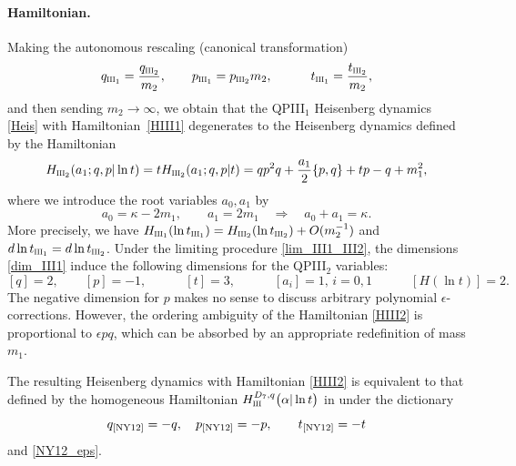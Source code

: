 \documentclass[12pt,a4paper]{article}
\numberwithin{equation}{section}
\newcommand{\III}{\scalebox{.6}{III}}
\begin{document}
\paragraph{Hamiltonian.}  Making the autonomous rescaling (canonical transformation)
\begin{equation}\label{lim_III1_III2}
 q_{\III_1}=\frac{q_{\III_2}}{m_2}, \qquad p_{\III_1}=p_{\III_2}m_2, \qquad \quad  t_{\III_1}=\frac{t_{\III_2}}{m_2},
 \end{equation}
 and then sending $m_2\rightarrow\infty$, we obtain that the QPIII$_1$ Heisenberg dynamics \eqref{Heis} with Hamiltonian~\eqref{HIII1} degenerates to the Heisenberg dynamics defined by the Hamiltonian
 \begin{equation}\label{HIII2}
 H_{\III_2}(a_1;q,p|\ln t)=t H_{\III_2}(a_1;q,p|t)=qp^2q+\frac{a_1}2\{p,q\}+t p-q+m_1^2,
 \end{equation}
 where we introduce the root variables $a_0,a_1$ by
\begin{equation}
a_0=\kappa-2m_1, \qquad a_1=2m_1  \quad \Rightarrow \quad a_0+a_1=\kappa.  
\end{equation} 
More precisely, we have
$H_{\III_1}(\ln t_{\III_1})=H_{\III_2}(\ln t_{\III_2})+O(m_2^{-1})$ and $d\ln t_{\III_1}=d\ln t_{\III_2}$.
Under the limiting procedure \eqref{lim_III1_III2}, the dimensions \eqref{dim_III1} induce the following dimensions for the QPIII$_2$ variables:
\begin{equation}\label{dim_III2}
[q]=2, \qquad [p]=-1, \qquad \quad [t]=3, \qquad \quad  [a_i]=1,\, {\scriptstyle i=0,1} \qquad \quad [H(\ln t)]=2.
\end{equation}
The negative dimension for $p$ makes no sense to discuss arbitrary polynomial $\epsilon$-corrections. However, the ordering ambiguity of the Hamiltonian \eqref{HIII2} is proportional to $\epsilon pq$, which can be absorbed by an appropriate redefinition of mass $m_1$.

The resulting Heisenberg dynamics with Hamiltonian \eqref{HIII2} is
equivalent to that defined by the homogeneous Hamiltonian $H^{D_7,q}_{\III}\big(\alpha|\ln t\big)$ in \cite[Sec. 2.5]{NY12} under the dictionary
\begin{equation}
q_{\textrm{\cite{NY12}}}=-q, \quad
p_{\textrm{\cite{NY12}}}=-p, \qquad  
t_{\textrm{\cite{NY12}}}=-t
\end{equation}
and \eqref{NY12_eps}.
\end{document}
